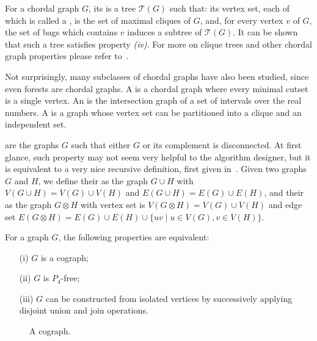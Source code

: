 For a chordal graph $G$, its  is a tree $\mathcal{T}(G)$ such that: its vertex set, each of which is called a , is the set of maximal cliques of $G$, and, for every vertex $v$ of $G$, the set of bags which contains $v$ induces a subtree of $\mathcal{T}(G)$. It can be shown that such a tree satisfies property \textit{(iv)}.
For more on clique trees and other chordal graph properties please refer to~\citep{clique_tree}.

Not surprisingly, many subclasses of chordal graphs have also been studied, since even forests are chordal graphs.
A  is a chordal graph where every minimal cutset is a single vertex.
An  is the intersection graph of a set of intervals over the real numbers.
A  is a graph whose vertex set can be partitioned into a clique and an independent set.

 are the graphs $G$ such that either $G$ or its complement is disconnected. At first glance, such property may not seem very helpful to the algorithm designer, but it is equivalent to a very nice recursive definition, first given in~\citep{cographs}.
Given two graphs $G$ and $H$, we define their  as the graph $G \cup H$ with $V(G \cup H)= V(G) \cup V(H)$ and $E(G \cup H) = E(G) \cup E(H)$, and their  as the graph $G \otimes H$ with vertex set is $V(G \otimes H)= V(G) \cup V(H)$ and edge set $E(G \otimes H)= E(G) \cup E(H) \cup \{uv \mid u \in V(G), v \in V(H)\}$.

\begin{class_definition*}[Cograph]
    For a graph $G$, the following properties are equivalent:
    \begin{itemize}
        \item[(i)] $G$ is a cograph;
        \item[(ii)] $G$ is $P_4$-free;
        \item[(iii)] $G$ can be constructed from isolated vertices by successively applying disjoint union and join operations.
    \end{itemize}
\end{class_definition*}

\begin{figure}[!htb]
    \centering
    \caption{A cograph.}
    \label{fig:some_cograph}
\end{figure}

